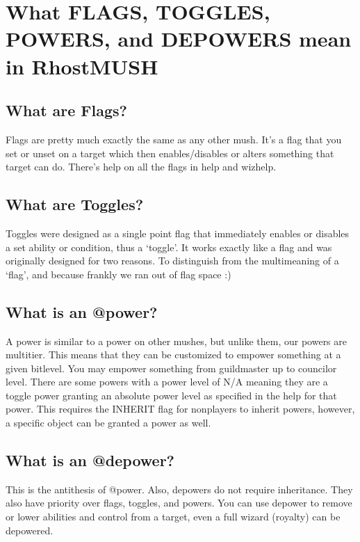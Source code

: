 \documentclass[letterpaper,10pt,english]{sphinxmanual}
\begin{document}
\chapter{What FLAGS, TOGGLES, POWERS, and DEPOWERS mean in RhostMUSH}
\label{\detokenize{toggles:what-flags-toggles-powers-and-depowers-mean-in-rhostmush}}\label{\detokenize{toggles::doc}}

\section{What are Flags?}
\label{\detokenize{toggles:what-are-flags}}
\sphinxAtStartPar
Flags are pretty much exactly the same as any other mush.  It’s a flag
that you set or unset on a target which then enables/disables or
alters something that target can do.  There’s help on all the flags
in help and wizhelp.


\section{What are Toggles?}
\label{\detokenize{toggles:what-are-toggles}}
\sphinxAtStartPar
Toggles were designed as a single point flag that immediately enables
or disables a set ability or condition, thus a ‘toggle’.  It works
exactly like a flag and was originally designed for two reasons.  To
distinguish from the multi\sphinxhyphen{}meaning of a ‘flag’, and because frankly
we ran out of flag space :)


\section{What is an @power?}
\label{\detokenize{toggles:what-is-an-power}}
\sphinxAtStartPar
A power is similar to a power on other mushes, but unlike them, our
powers are multi\sphinxhyphen{}tier.  This means that they can be customized to
empower something at a given bitlevel.  You may empower something
from guildmaster up to councilor level.  There are some powers
with a power level of N/A meaning they are a toggle power granting
an absolute power level as specified in the help for that power.
This requires the INHERIT flag for non\sphinxhyphen{}players to inherit powers,
however, a specific object can be granted a power as well.


\section{What is an @depower?}
\label{\detokenize{toggles:what-is-an-depower}}
\sphinxAtStartPar
This is the anti\sphinxhyphen{}thesis of @power.  Also, depowers do not require
inheritance.  They also have priority over flags, toggles, and
powers.  You can use depower to remove or lower abilities and
control from a target, even a full wizard (royalty) can be
depowered.
\end{document}
